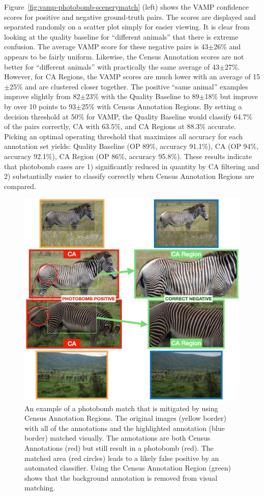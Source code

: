 Figure~\ref{fig:vamp-photobomb-scenerymatch} (left) shows the VAMP confidence scores for positive and negative ground-truth pairs.  The scores are displayed and separated randomly on a scatter plot simply for easier viewing.  It is clear from looking at the quality baseline for ``different animals'' that there is extreme confusion.  The average VAMP score for these negative pairs is 43$\pm$26\% and appears to be fairly uniform.  Likewise, the Census Annotation scores are not better for ``different animals'' with practically the same average of 43$\pm$27\%.  However, for CA Regions, the VAMP scores are much lower with an average of 15$\pm$25\% and are clustered closer together.  The positive ``same animal'' examples improve slightly from 82$\pm$23\% with the Quality Baseline to 89$\pm$18\% but improve by over 10 points to 93$\pm$25\% with Census Annotation Regions.  By setting a decision threshold at 50\% for VAMP, the Quality Baseline would classify 64.7\% of the pairs correctly, CA with 63.5\%, and CA Regions at 88.3\% accurate.  Picking an optimal operating threshold that maximizes all accuracy for each annotation set yields: Quality Baseline (OP 89\%, accuracy 91.1\%), CA (OP 94\%, accuracy 92.1\%), CA Region (OP 86\%, accuracy 95.8\%).  These results indicate that photobomb cases are 1) significantly reduced in quantity by CA filtering and 2) substantially easier to classify correctly when Census Annotation Regions are compared.

\begin{figure}[!t]
    \begin{center}
        \includegraphics[width=0.7\linewidth]{resources/photobomb-001.pdf}
    \end{center}
    \caption{An example of a photobomb match that is mitigated by using Census Annotation Regions.  The original images (yellow border) with all of the annotations and the highlighted annotation (blue border) matched visually.  The annotations are both Census Annotations (red) but still result in a photobomb (red).  The matched area (red circles) leads to a likely false positive by an automated classifier.  Using the Census Annotation Region (green) shows that the background annotation is removed from visual matching.}
    \label{fig:ca-photobomb-example}
\end{figure}


